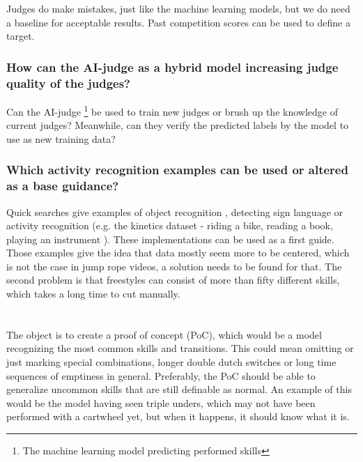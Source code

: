 Judges do make mistakes, just like the machine learning models, but we do need a baseline for acceptable results. Past competition scores can be used to define a target.

\subsubsection{How can the AI-judge as a hybrid model increasing judge quality of the judges?}
\label{subsubsec:intro-question-hybrid-model-judge-quality}
Can the AI-judge \footnote{The machine learning model predicting performed skills} be used to train new judges or brush up the knowledge of current judges? Meanwhile, can they verify the predicted labels by the model to use as new training data?

\subsubsection{Which activity recognition examples can be used or altered as a base guidance?}
\label{subsubsec:intro-question-earlier-research-guidance}

Quick searches give examples of object recognition \autocite{Diwaker_2022}, detecting sign language \autocite{Bora_2023} or activity recognition (e.g. the kinetics dataset - riding a bike, reading a book, playing an instrument \autocite{Kay_2017}).
These implementations can be used as a first guide.
Those examples give the idea that data mostly seem more to be centered, which is not the case in jump rope videos, a solution needs to be found for that. The second problem is that freestyles can consist of more than fifty different skills, which takes a long time to cut manually.

\section{}%
\label{sec:onderzoeksdoelstelling}

The object is to create a proof of concept (PoC), which would be a model recognizing the most common skills and transitions.
This could mean omitting or just marking special combinations, longer double dutch switches or long time sequences of emptiness in general. Preferably, the PoC should be able to generalize uncommon skills that are still definable as normal. An example of this would be the model having seen triple unders, which may not have been performed with a cartwheel yet, but when it happens, it should know what it is.

